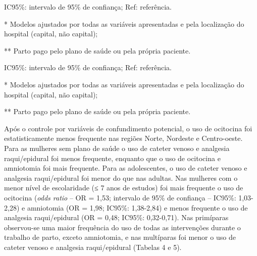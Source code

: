 \documentclass{article}
\begin{document}
IC95\%: intervalo de 95\% de confiança; Ref: referência.

* Modelos ajustados por todas as variáveis apresentadas e pela
localização do hospital (capital, não capital);

** Parto pago pelo plano de saúde ou pela própria paciente.

IC95\%: intervalo de 95\% de confiança; Ref: referência.

* Modelos ajustados por todas as variáveis apresentadas e pela
localização do hospital (capital, não capital);

** Parto pago pelo plano de saúde ou pela própria paciente.

Após o controle por variáveis de confundimento potencial, o uso de ocitocina foi
estatisticamente menos frequente nas regiões Norte, Nordeste e Centro-oeste.
Para as
mulheres sem plano de saúde o uso de cateter venoso e analgesia raqui/epidural
foi
menos frequente, enquanto que o uso de ocitocina e amniotomia foi mais
frequente.
Para as adolescentes, o uso de cateter venoso e analgesia raqui/epidural foi
menor
do que nas adultas. Nas mulheres com o menor nível de escolaridade (≤ 7 anos de
estudos) foi mais frequente o uso de ocitocina (\textit{odds ratio}
– OR =
1,53; intervalo de 95\% de confiança – IC95\%: 1,03-2,28) e amniotomia (OR =
1,98;
IC95\%: 1,38-2,84) e menos frequente o uso de analgesia raqui/epidural (OR =
0,48;
IC95\%: 0,32-0,71). Nas primíparas observou-se uma maior frequência do uso de
todas
as intervenções durante o trabalho de parto, exceto amniotomia, e nas multíparas
foi
menor o uso de cateter venoso e analgesia raqui/epidural (Tabelas 4 e 5).
\end{document}
